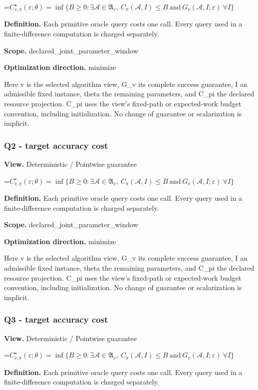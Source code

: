 \documentclass[10pt,a4paper]{article}
\newcommand{\AtlasMath}[1]{\par\begingroup\centering\setbox0=\hbox{$\displaystyle #1$}\ifdim\wd0>1.4\linewidth\typeout{ATLAS WIDE FORMULA: \the\wd0}\fi\ifdim\wd0>\linewidth\resizebox{\linewidth}{!}{\box0}\else\box0\fi\par\endgroup}
\begin{document}
\AtlasMath{C^\star_{v,\pi}(\varepsilon;\theta)=\inf\{B\ge0:\exists\mathcal A\in\mathfrak A_v,\ C_\pi(\mathcal A,I)\le B\ \text{and}\ G_v(\mathcal A,I;\varepsilon)\ \forall I\}}
\textbf{Definition.} Each primitive oracle query costs one call. Every query used in a finite-difference computation is charged separately.

\textbf{Scope.} declared\_joint\_parameter\_window

\textbf{Optimization direction.} minimize

Here v is the selected algorithm view, G\_v its complete success guarantee, I an admissible fixed instance, theta the remaining parameters, and C\_pi the declared resource projection. C\_pi uses the view's fixed-path or expected-work budget convention, including initialization. No change of guarantee or scalarization is implicit.

\subsubsection{Q2 - target accuracy cost}
\textbf{View.} Deterministic / Pointwise guarantee

\AtlasMath{C^\star_{v,\pi}(\varepsilon;\theta)=\inf\{B\ge0:\exists\mathcal A\in\mathfrak A_v,\ C_\pi(\mathcal A,I)\le B\ \text{and}\ G_v(\mathcal A,I;\varepsilon)\ \forall I\}}
\textbf{Definition.} Each primitive oracle query costs one call. Every query used in a finite-difference computation is charged separately.

\textbf{Scope.} declared\_joint\_parameter\_window

\textbf{Optimization direction.} minimize

Here v is the selected algorithm view, G\_v its complete success guarantee, I an admissible fixed instance, theta the remaining parameters, and C\_pi the declared resource projection. C\_pi uses the view's fixed-path or expected-work budget convention, including initialization. No change of guarantee or scalarization is implicit.

\subsubsection{Q3 - target accuracy cost}
\textbf{View.} Deterministic / Pointwise guarantee

\AtlasMath{C^\star_{v,\pi}(\varepsilon;\theta)=\inf\{B\ge0:\exists\mathcal A\in\mathfrak A_v,\ C_\pi(\mathcal A,I)\le B\ \text{and}\ G_v(\mathcal A,I;\varepsilon)\ \forall I\}}
\textbf{Definition.} Each primitive oracle query costs one call. Every query used in a finite-difference computation is charged separately.
\end{document}
